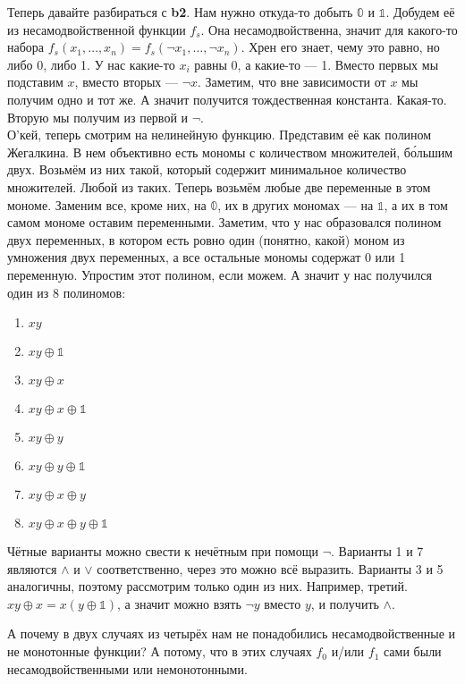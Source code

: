 \documentclass{article}
\begin{document}
\begin{itemize}
\begin{Proof}
            Теперь давайте разбираться с \textbf{b2}. Нам нужно откуда-то добыть $\mathbb0$ и $\mathbb1$. Добудем её из несамодвойственной функции $f_s$. Она несамодвойственна, значит для какого-то набора $f_s(x_1,\ldots,x_n)=f_s(\neg x_1,\ldots,\neg x_n)$. Хрен его знает, чему это равно, но либо 0, либо 1. У нас какие-то $x_i$ равны 0, а какие-то --- 1. Вместо первых мы подставим $x$, вместо вторых --- $\neg x$. Заметим, что вне зависимости от $x$ мы получим одно и тот же. А значит получится тождественная константа. Какая-то. Вторую мы получим из первой и $\neg$.\\
            О'кей, теперь смотрим на нелинейную функцию. Представим её как полином Жегалкина. В нем объективно есть мономы с количеством множителей, б\'{о}льшим двух. Возьмём из них такой, который содержит минимальное количество множителей. Любой из таких. Теперь возьмём любые две переменные в этом мономе. Заменим все, кроме них, на $\mathbb0$, их в других мономах --- на $\mathbb1$, а их в том самом мономе оставим переменными. Заметим, что у нас образовался полином двух переменных, в котором есть ровно один (понятно, какой) моном из умножения двух переменных, а все остальные мономы содержат 0 или 1 переменную. Упростим этот полином, если можем. А значит у нас получился один из 8 полиномов:
            \begin{enumerate}[1.]
                \item $xy$
                \item $xy\oplus\mathbb1$
                \item $xy\oplus x$
                \item $xy\oplus x\oplus\mathbb1$
                \item $xy\oplus y$
                \item $xy\oplus y\oplus\mathbb1$
                \item $xy\oplus x\oplus y$
                \item $xy\oplus x\oplus y\oplus\mathbb1$
            \end{enumerate}
            Чётные варианты можно свести к нечётным при помощи $\neg$. Варианты 1 и 7 являются $\land$ и $\lor$ соответственно, через это можно всё выразить. Варианты 3 и 5 аналогичны, поэтому рассмотрим только один из них. Например, третий. $xy\oplus x=x(y\oplus\mathbb1)$, а значит можно взять $\neg y$ вместо $y$, и получить $\land$.
        \end{Proof}
        \begin{Comment}
            А почему в двух случаях из четырёх нам не понадобились несамодвойственные и не монотонные функции? А потому, что в этих случаях $f_0$ и/или $f_1$ сами были несамодвойственными или немонотонными.

\end{Comment}
\end{itemize}
\end{document}
